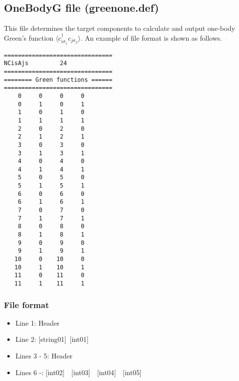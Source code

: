 \newpage
\subsection{OneBodyG file (greenone.def)}
\label{Subsec:onebodyg}
This file determines the target components to calculate and output one-body Green's function $\langle c_{i\sigma_1}^{\dagger}c_{j\sigma_2}\rangle$. An example of file format is shown as follows.

\begin{minipage}{12.5cm}
\begin{screen}
\begin{verbatim}
===============================
NCisAjs         24
===============================
======== Green functions ======
===============================
    0     0     0     0
    0     1     0     1
    1     0     1     0
    1     1     1     1
    2     0     2     0
    2     1     2     1
    3     0     3     0
    3     1     3     1
    4     0     4     0
    4     1     4     1
    5     0     5     0
    5     1     5     1
    6     0     6     0
    6     1     6     1
    7     0     7     0
    7     1     7     1
    8     0     8     0
    8     1     8     1
    9     0     9     0
    9     1     9     1
   10     0    10     0
   10     1    10     1
   11     0    11     0
   11     1    11     1
\end{verbatim}
\end{screen}
\end{minipage}

\subsubsection{File format}
 \begin{itemize}
   \item  Line 1:  Header
   \item  Line 2:   [string01]~[int01]
   \item  Lines 3 - 5:  Header
   \item  Lines 6 -: 
  [int02]~~[int03]~~[int04]~~[int05]
  \end{itemize}
